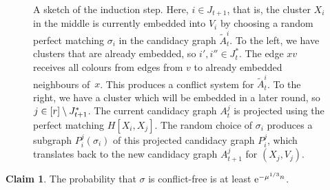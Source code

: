 \documentclass[10pt]{amsart}
\theoremstyle{definition}
\theoremstyle{claimstyle}
\newtheorem{claim}{Claim}
\theoremstyle{stepstyle}
\numberwithin{equation}{section}
\begin{document}
\begin{figure}[t]
\begin{center}
\end{center}
\caption{A sketch of the induction step. Here, $i\in J_{t+1}$, that is, the cluster $X_i$ in the middle is currently embedded into $V_i$ by choosing a random perfect matching $\sigma_i$ in the candidacy graph $\tilde{A}_t^{i}$. To the left, we have clusters that are already embedded, so $i',i''\in J_t^\ast$. The edge $xv$ receives all colours from edges from $v$ to already embedded neighbours of~$x$. This produces a conflict system for $\tilde{A}_t^{i}$. To the right, we have a cluster which will be embedded in a later round, so $j\in [r]\setminus J_{t+1}^*$. The current candidacy graph $A_t^j$ is projected using the perfect matching $H[X_i,X_j]$. The random choice of $\sigma_i$ produces a subgraph $P^j_i(\sigma_i)$ of this projected candidacy graph $P_i^j$, which translates back to the new candidacy graph $A_{t+1}^j$ for $(X_j,V_j)$.}
\label{fig:induction step}
\end{figure}




\begin{NoHyper}
\begin{claim}\label{claim:conflict free}
The probability that $\sigma$ is conflict-free is at least ${\rm e}^{-\mu^{1/3} n}$.
\end{claim}
\end{NoHyper}
\end{document}
